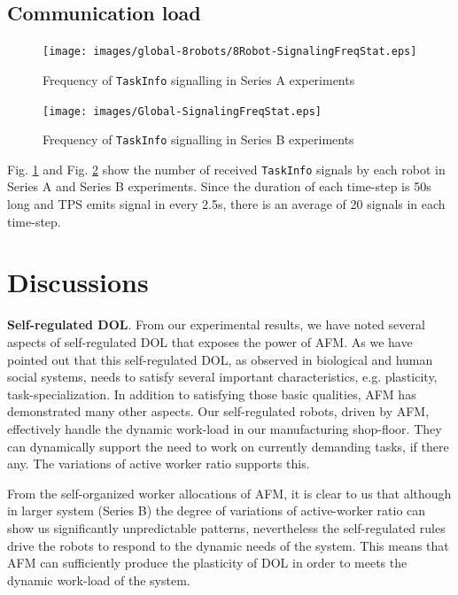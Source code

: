 \documentclass[preprint,12pt]{elsarticle}
\begin{document}
\subsection*{Communication load}
\begin{figure}
\centering
\texttt{[image: images/global-8robots/8Robot-SignalingFreqStat.eps]}
\caption{\small Frequency of \texttt{TaskInfo} signalling in Series A experiments}
\label{fig:signal-frequency-stat-SA} 
\end{figure}
\begin{figure}
\centering
\texttt{[image: images/Global-SignalingFreqStat.eps]}
\caption{\small Frequency of \texttt{TaskInfo} signalling in Series B experiments}
\label{fig:signal-frequency-stat-SB} 
\end{figure}
Fig. \ref{fig:signal-frequency-stat-SA}  and Fig. \ref{fig:signal-frequency-stat-SB}  show the number of received \texttt{TaskInfo} signals by each robot in Series A and Series B experiments. Since the duration of each time-step is 50s long and TPS emits signal in every 2.5s, there is an average of 20 signals in each time-step.
\section{Discussions}
\label{sec:discuss}
\textbf{Self-regulated DOL}. From our experimental results, we have noted several aspects of self-regulated DOL that exposes the power of AFM. As we have pointed out that this self-regulated DOL, as observed in biological and human social systems, needs to satisfy several important characteristics, e.g. plasticity, task-specialization. In addition to satisfying those basic qualities, AFM has demonstrated many other aspects. Our self-regulated robots, driven by AFM, effectively handle the dynamic work-load in our manufacturing shop-floor. They can dynamically support the need to work on currently demanding tasks, if there any. The variations of active worker ratio supports this. 

From the self-organized worker allocations of AFM, it is clear to us that although in larger system (Series B) the degree of variations of active-worker ratio can show us significantly unpredictable patterns, nevertheless the self-regulated rules drive the robots to respond to the dynamic needs of the system. This means that AFM can sufficiently produce the plasticity of DOL in order to meets the dynamic work-load of the system.
\end{document}
